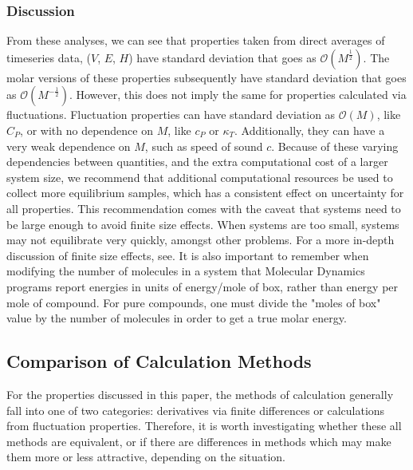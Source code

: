 \documentclass[aps,pre,twocolumn,nofootinbib,superscriptaddress,linenumbers,10pt, draft,tightenlines]{revtex4-1}
\begin{document}
\subsubsection{Discussion}
From these analyses, we can see that properties taken from direct averages of timeseries data, ($V$, $E$, $H$) have standard deviation that goes as $\mathcal{O}(M^{\frac{1}{2}})$.  The molar versions of these properties subsequently have standard deviation that goes as $\mathcal{O}(M^{-\frac{1}{2}})$.  However, this does not imply the same for properties calculated via fluctuations.  Fluctuation properties can have standard deviation as $\mathcal{O}(M)$, like $C_P$, or with no dependence on $M$, like $c_P$ or $\kappa_T$.  Additionally, they can have a very weak dependence on $M$, such as speed of sound $c$.  Because of these varying dependencies between quantities, and the extra computational cost of a larger system size, we recommend that additional computational resources be used to collect more equilibrium samples, which has a consistent effect on uncertainty for all properties.  This recommendation comes with the caveat that systems need to be large enough to avoid finite size effects.  When systems are too small, systems may not equilibrate very quickly, amongst other problems.  For a more in-depth discussion of finite size effects, see. %
It is also important to remember when modifying the number of molecules in a system that Molecular Dynamics programs report energies in units of energy/mole of box, rather than energy per mole of compound.  For pure compounds, one must divide the "moles of box" value by the number of molecules in order to get a true molar energy.


\subsection{Comparison of Calculation Methods}

For the properties discussed in this paper, the methods of calculation generally fall into one of two categories: derivatives via finite differences or calculations from fluctuation properties. Therefore, it is worth investigating whether these all methods are equivalent, or if there are differences in methods which may make them more or less attractive, depending on the situation.  
\end{document}
